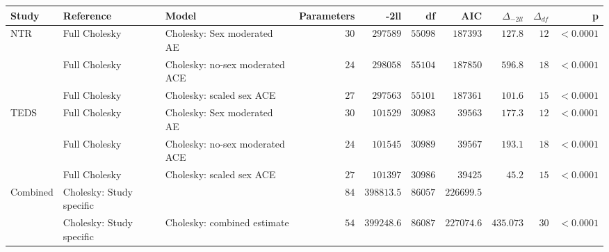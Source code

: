 \begin{tabular}{lllrrrrrrr}
	\hline\hline
	Study     & Reference                & Model                          & Parameters & -2ll       & df      & AIC        & $\Delta_{-2ll}$ & $\Delta_{df}$ & p\tabularnewline
	\hline
	NTR       & Full Cholesky            & Cholesky: Sex moderated AE     & $ 30$      & $297589$   & $55098$ & $187393$   & $127.8$         & $ 12$         & $< 0.0001$\tabularnewline
	          & Full Cholesky            & Cholesky: no-sex moderated ACE & $ 24$      & $298058$   & $55104$ & $187850$   & $596.8$         & $ 18$         & $< 0.0001$\tabularnewline
	          & Full Cholesky            & Cholesky: scaled sex ACE       & $ 27$      & $297563$   & $55101$ & $187361$   & $101.6$         & $ 15$         & $< 0.0001$\tabularnewline
	TEDS      & Full Cholesky            & Cholesky: Sex moderated AE     & $ 30$      & $101529$   & $30983$ & $ 39563$   & $177.3$         & $ 12$         & $< 0.0001$\tabularnewline
	          & Full Cholesky            & Cholesky: no-sex moderated ACE & $ 24$      & $101545$   & $30989$ & $ 39567$   & $193.1$         & $ 18$         & $< 0.0001$\tabularnewline
	          & Full Cholesky            & Cholesky: scaled sex ACE       & $ 27$      & $101397$   & $30986$ & $ 39425$   & $ 45.2$         & $ 15$         & $< 0.0001$\tabularnewline
	Combined  & Cholesky: Study specific &                                & $84$       & $398813.5$ & $86057$ & $226699.5$ &                 &               & \tabularnewline
	          & Cholesky: Study specific & Cholesky: combined estimate    & $54$       & $399248.6$ & $86087$ & $227074.6$ & $435.073$       & $30$          & $< 0.0001$\tabularnewline
	\hline
\end{tabular}
